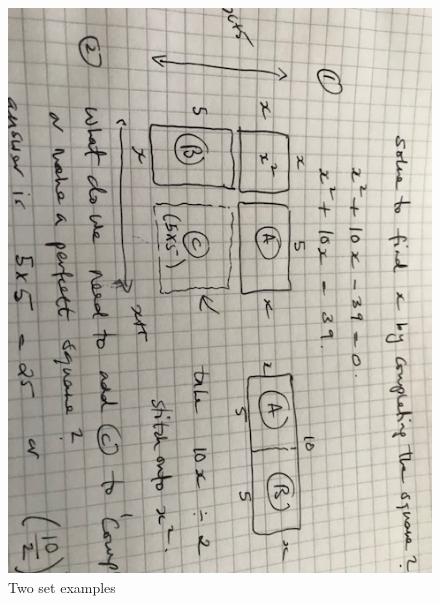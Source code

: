 \begin{figure}[h]
    \centering
    \includegraphics[width=1.25\textwidth]{IMG_3050}
    \caption{Two set examples}
    \label{fig:example1}
\end{figure}


